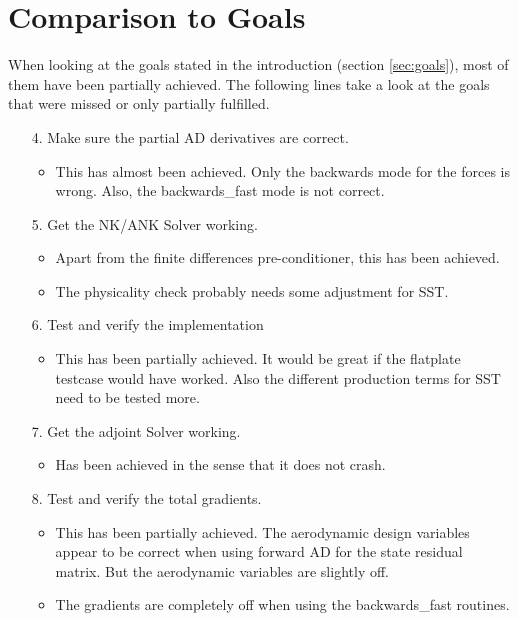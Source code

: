 \section{Comparison to Goals}
When looking at the goals stated in the introduction (section \ref{sec:goals}),
most of them have been partially achieved. The following lines take a look at
the goals that were missed or only partially fulfilled.

\begin{enumerate}

    \item[4.] Make sure the partial AD derivatives are correct. 
        \begin{itemize}
            \item This has almost been achieved. Only the backwards mode for
                the forces is wrong. Also, the backwards\_fast mode is not
                correct.
        \end{itemize}

    \item[5.] Get the NK/ANK Solver working.
        \begin{itemize}
            \item Apart from the finite differences pre-conditioner, this has
                been achieved.

            \item The physicality check probably needs some adjustment for
                SST.
        \end{itemize}

    \item[6.] Test and verify the implementation
        \begin{itemize}
            \item This has been partially achieved. It would be great if the
                flatplate testcase would have worked. Also the different
                production terms for SST need to be tested more.
        \end{itemize}

    \item[7.] Get the adjoint Solver working.
        \begin{itemize}
            \item Has been achieved in the sense that it does not crash.
        \end{itemize}

    \item[8.] Test and verify the total gradients.
        \begin{itemize}
            \item This has been partially achieved. The aerodynamic design
                variables appear to be correct when using forward AD for the
                state residual matrix. But the aerodynamic variables are
                slightly off. 

            \item The gradients are completely off when using the
                backwards\_fast routines.
        \end{itemize}
\end{enumerate}

